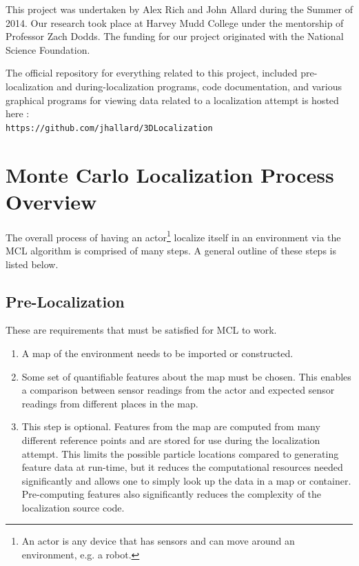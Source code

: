 \documentclass[a4paper,11pt]{article}
\begin{document}
 This project was undertaken by Alex Rich and John Allard during the Summer of 2014. Our research took place at Harvey Mudd College under the mentorship of Professor Zach Dodds. The funding for our project originated with the National Science Foundation. 

 The official repository for everything related to this project, included pre-localization and during-localization programs, code documentation, and various graphical programs for viewing data related to a localization attempt is hosted here : \\
\texttt{https://github.com/jhallard/3DLocalization}

\newpage

  \section{Monte Carlo Localization Process Overview}

The overall process of having an actor\footnote{An actor is any device that has sensors and can move around an environment, e.g. a robot.} localize itself in an environment via the MCL algorithm is comprised of many steps. A general outline of these steps is listed below.
\subsection{Pre-Localization}
 These are requirements that must be satisfied for MCL to work.
  \begin{enumerate}
  \item A map of the environment needs to be imported or constructed. 
  \item Some set of quantifiable features about the map must be chosen. This enables a comparison between sensor readings from the actor and expected sensor readings from different places in the map.
  \item This step is optional.  Features from the map are computed from many different reference points and are stored for use during the localization attempt. This limits the possible particle locations compared to generating feature data at run-time, but it reduces the computational resources needed significantly and allows one to simply look up the data in a map or container. Pre-computing features also significantly reduces the complexity of the localization source code.
  \end{enumerate}
\end{document}
